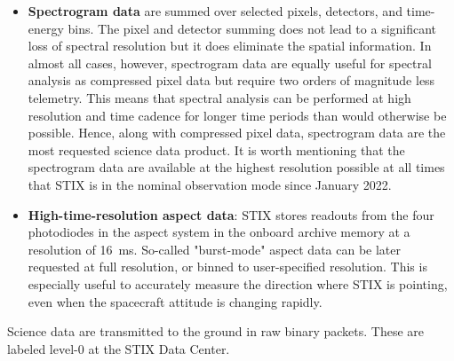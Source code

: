 \documentclass[referee]{aa} %
\begin{document}
\begin{itemize}
\item {\bf Spectrogram data} are summed over selected pixels, detectors, and time-energy bins. The pixel and detector summing does not lead to a significant loss of spectral resolution but it does eliminate the spatial information.  In almost all cases, however, spectrogram data are equally useful for spectral analysis as compressed pixel data but require two orders of magnitude less telemetry.  This means that spectral analysis can be performed at high resolution and time cadence for longer time periods than would otherwise be possible.  Hence, along with compressed pixel data, spectrogram data are the most requested science data product. It is worth mentioning that the spectrogram data are available at the highest resolution possible at all times that STIX is in the nominal observation mode since January 2022. 

\item {\bf High-time-resolution aspect data}: STIX stores readouts from the four photodiodes in the aspect system in the onboard archive memory at a resolution of 16~ms. So-called "burst-mode" aspect data can be later requested at full resolution, or binned to user-specified resolution. This is especially useful to accurately measure the direction where STIX is pointing, even when the spacecraft attitude is changing rapidly.
\end{itemize}
Science data are transmitted to the ground in raw binary packets.  
These are labeled level-0 at the STIX Data Center.  
\end{document}
